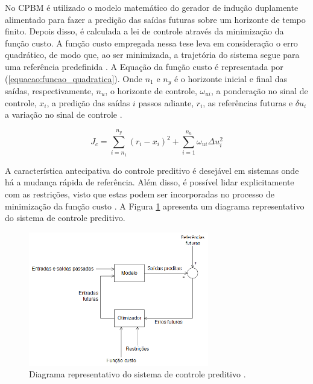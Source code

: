 	No CPBM é utilizado o modelo matemático do gerador de indução duplamente alimentado para fazer a predição das saídas futuras sobre um horizonte de tempo finito. Depois disso, é calculada a lei de controle através da minimização da função custo. A função custo empregada nessa tese leva em consideração o erro quadrático, de modo que, ao ser minimizada, a trajetória do sistema segue para uma referência predefinida \cite{estevaopreditivo}. A Equação da função custo é representada por (\ref{equacao:funcao_quadratica}). Onde $n_1$ e $n_y$ é o horizonte inicial e final das saídas, respectivamente, $n_u$, o horizonte de controle,  $\omega_{ui}$, a ponderação no sinal de controle, $x_i$, a predição das saídas $i$ passos adiante, $r_i$, as referências futuras e $\delta u_i$ a variação no sinal de controle \cite{alfeu}.
	
	\begin{equation} 
	\label{equacao:funcao_quadratica}
	J_c  = \sum_{i=n_1}^{n_y}(r_i-x_i)^2+\sum_{i=1}^{n_u}\omega_{ui}\Delta u_i^2
	\end{equation}
	
	A característica antecipativa do controle preditivo é desejável em sistemas onde há a mudança rápida de referência. Além disso, é possível lidar explicitamente com as restrições, visto que estas podem ser incorporadas no processo de minimização da função custo \cite{alfeu,preditivorestricoes}. A Figura \ref{figura:preditivo_esquema} apresenta um diagrama representativo do sistema de controle preditivo.
	
	\begin{figure}[ht]
		\centering
		\includegraphics[width=0.7\textwidth]{Figuras/preditivo_esquematico.png}
		\caption{Diagrama representativo do sistema de controle preditivo \cite{alfeu}.}
		\label{figura:preditivo_esquema}
	\end{figure}

